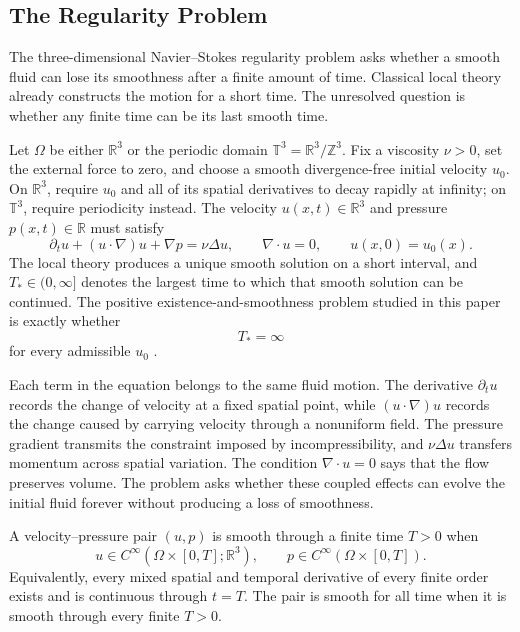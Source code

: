 \subsection{The Regularity Problem}\label{sub:TheRegularityProblem}

The three-dimensional Navier--Stokes regularity problem asks whether a smooth fluid can lose its smoothness after a finite amount of time.
Classical local theory already constructs the motion for a short time.
The unresolved question is whether any finite time can be its last smooth time.

Let \(\Omega\) be either \(\mathbb R^3\) or the periodic domain \(\mathbb T^3=\mathbb R^3/\mathbb Z^3\).
Fix a viscosity \(\nu>0\), set the external force to zero, and choose a smooth divergence-free initial velocity \(u_0\).
On \(\mathbb R^3\), require \(u_0\) and all of its spatial derivatives to decay rapidly at infinity; on \(\mathbb T^3\), require periodicity instead.
The velocity \(u(x,t)\in\mathbb R^3\) and pressure \(p(x,t)\in\mathbb R\) must satisfy
\[
  \partial_tu+(u\cdot\nabla)u+\nabla p
  =
  \nu\Delta u,
  \qquad
  \nabla\cdot u=0,
  \qquad
  u(x,0)=u_0(x).
\]
The local theory produces a unique smooth solution on a short interval, and \(T_*\in(0,\infty]\) denotes the largest time to which that smooth solution can be continued.
The positive existence-and-smoothness problem studied in this paper is exactly whether
\[
  T_*=\infty
\]
for every admissible \(u_0\) \parencite{Fefferman2000}.

Each term in the equation belongs to the same fluid motion.
The derivative \(\partial_tu\) records the change of velocity at a fixed spatial point, while \((u\cdot\nabla)u\) records the change caused by carrying velocity through a nonuniform field.
The pressure gradient transmits the constraint imposed by incompressibility, and \(\nu\Delta u\) transfers momentum across spatial variation.
The condition \(\nabla\cdot u=0\) says that the flow preserves volume.
The problem asks whether these coupled effects can evolve the initial fluid forever without producing a loss of smoothness.


\begin{definition}[Smoothness]\label{def:Smoothness}
A velocity--pressure pair \((u,p)\) is smooth through a finite time \(T>0\) when
\[
  u\in C^\infty\!\left(\Omega\times[0,T];\mathbb R^3\right),
  \qquad
  p\in C^\infty\!\left(\Omega\times[0,T]\right).
\]
Equivalently, every mixed spatial and temporal derivative of every finite order exists and is continuous through \(t=T\).
The pair is smooth for all time when it is smooth through every finite \(T>0\).
\end{definition}

